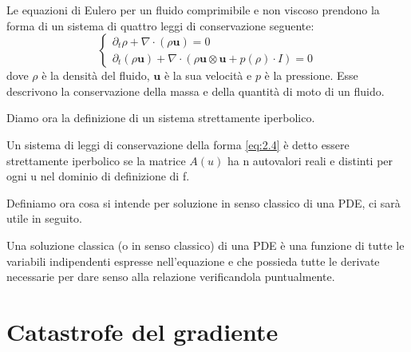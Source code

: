 \begin{esempio}
Le equazioni di Eulero per un fluido comprimibile e non viscoso prendono la forma di un sistema di quattro leggi di conservazione seguente:
\begin{equation}\label{eq:2.6}
    \begin{cases}
        \partial_{t}\rho + \nabla\cdot\left(\rho \mathbf{u}\right) = 0\\
        \partial_{t}(\rho\mathbf{u}) + \nabla\cdot(\rho\mathbf{u}\otimes\mathbf{u} + p(\rho)\cdot I) = 0
    \end{cases}
\end{equation}
dove $\rho$ è la densità del fluido, $\mathbf{u}$ è la sua velocità e $p$ è la pressione. Esse descrivono la conservazione della massa e della quantità di moto di un fluido.
\end{esempio}

Diamo ora la definizione di un sistema strettamente iperbolico.

\begin{definizione}
    Un sistema di leggi di conservazione della forma \eqref{eq:2.4} è detto essere strettamente iperbolico se la matrice $A(u)$ ha n autovalori reali e distinti per ogni u nel dominio di definizione di f.
\end{definizione}

Definiamo ora cosa si intende per soluzione in senso classico di una PDE, ci sarà utile in seguito.
\begin{definizione}
Una soluzione classica (o in senso classico) di una PDE è una funzione di tutte le variabili indipendenti espresse nell'equazione e che possieda tutte le derivate necessarie per dare senso alla relazione verificandola puntualmente.
\end{definizione}

\section{Catastrofe del gradiente}


